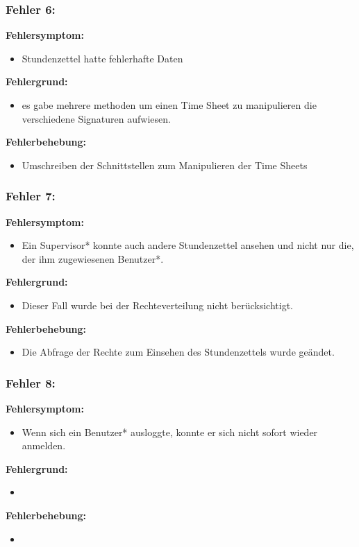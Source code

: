 \subsubsection{Fehler 6:} %
\textbf{Fehlersymptom:}
	\begin{itemize}
		\item Stundenzettel hatte fehlerhafte Daten
	\end{itemize}
\textbf{Fehlergrund:}
	\begin{itemize}
		\item es gabe mehrere methoden um einen Time Sheet zu manipulieren die verschiedene Signaturen aufwiesen.
	\end{itemize}
\textbf{Fehlerbehebung:}
	\begin{itemize}
		\item Umschreiben der Schnittstellen zum Manipulieren der Time Sheets
	\end{itemize}

\subsubsection{Fehler 7:} %
\textbf{Fehlersymptom:}
	\begin{itemize}
		\item Ein Supervisor* konnte auch andere Stundenzettel ansehen und nicht nur die, der ihm zugewiesenen Benutzer*.
	\end{itemize}
\textbf{Fehlergrund:}
	\begin{itemize}
		\item Dieser Fall wurde bei der Rechteverteilung nicht berücksichtigt.
	\end{itemize}
\textbf{Fehlerbehebung:}
	\begin{itemize}
		\item Die Abfrage der Rechte zum Einsehen des Stundenzettels wurde geändet.
	\end{itemize}

\subsubsection{Fehler 8:} %
\textbf{Fehlersymptom:}
	\begin{itemize}
		\item Wenn sich ein Benutzer* ausloggte, konnte er sich nicht sofort wieder anmelden.
	\end{itemize}
\textbf{Fehlergrund:}
	\begin{itemize}
		\item 
	\end{itemize}
\textbf{Fehlerbehebung:}
	\begin{itemize}
		\item 
	\end{itemize}

